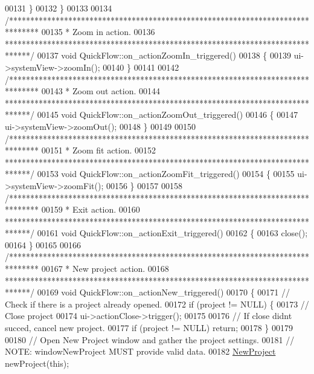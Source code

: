 \begin{DoxyCode}
00131   \}
00132 \}
00133 
00134 \textcolor{comment}{/*******************************************************************************}
00135 \textcolor{comment}{ * Zoom in action.}
00136 \textcolor{comment}{ ******************************************************************************/}
00137 \textcolor{keywordtype}{void} QuickFlow::on\_actionZoomIn\_triggered()
00138 \{
00139   ui->systemView->zoomIn();
00140 \}
00141 
00142 \textcolor{comment}{/*******************************************************************************}
00143 \textcolor{comment}{ * Zoom out action.}
00144 \textcolor{comment}{ ******************************************************************************/}
00145 \textcolor{keywordtype}{void} QuickFlow::on\_actionZoomOut\_triggered()
00146 \{
00147   ui->systemView->zoomOut();
00148 \}
00149 
00150 \textcolor{comment}{/*******************************************************************************}
00151 \textcolor{comment}{ * Zoom fit action.}
00152 \textcolor{comment}{ ******************************************************************************/}
00153 \textcolor{keywordtype}{void} QuickFlow::on\_actionZoomFit\_triggered()
00154 \{
00155   ui->systemView->zoomFit();
00156 \}
00157 
00158 \textcolor{comment}{/*******************************************************************************}
00159 \textcolor{comment}{ * Exit action.}
00160 \textcolor{comment}{ ******************************************************************************/}
00161 \textcolor{keywordtype}{void} QuickFlow::on\_actionExit\_triggered()
00162 \{
00163   close();
00164 \}
00165 
00166 \textcolor{comment}{/*******************************************************************************}
00167 \textcolor{comment}{ * New project action.}
00168 \textcolor{comment}{ ******************************************************************************/}
00169 \textcolor{keywordtype}{void} QuickFlow::on\_actionNew\_triggered()
00170 \{
00171   \textcolor{comment}{// Check if there is a project already opened.}
00172   \textcolor{keywordflow}{if} (project != NULL) \{
00173     \textcolor{comment}{// Close project}
00174     ui->actionClose->trigger();
00175 
00176     \textcolor{comment}{// If close didnt succed, cancel new project.}
00177     \textcolor{keywordflow}{if} (project != NULL) \textcolor{keywordflow}{return};
00178   \}
00179 
00180   \textcolor{comment}{// Open New Project window and gather the project settings.}
00181   \textcolor{comment}{// NOTE: windowNewProject MUST provide valid data.}
00182   \hyperlink{class_new_project}{NewProject} newProject(\textcolor{keyword}{this});

\end{DoxyCode}
